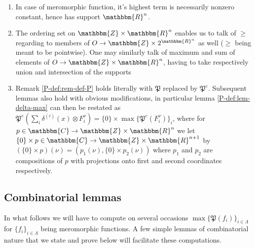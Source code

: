 \documentclass{article}
\numberwithin{definition}{section}
\numberwithin{lemma}{section}
\numberwithin{proposition}{section}
{\theorembodyfont{\rmfamily}\newtheorem{remark}{Remark}
\numberwithin{remark}{section}
}
\begin{document}
\begin{remark}
  
  \begin{enumerate}
    \item In case of meromorphic function, it's highest term is necessarily
    nonzero constant, hence has support $\mathbbm{R}^n$.
    
    \item The ordering set on $\mathbbm{Z} \times \mathbbm{R}^n$ enables us to
    talk of $\geqslant$ regarding to members of $O \rightarrow \mathbbm{Z}
    \times 2^{\mathbbm{R}^n}$ as well ($\geqslant$ being meant to be
    pointwise). One may similarly talk of maximum and sum of elements of $O
    \rightarrow \mathbbm{Z} \times \mathbbm{R}^n$, having to take respectively
    union and intersection of the supports
    
    \item Remark \ref{P-def:rem-def-P} holds literally with $\mathfrak{P}$
    replaced by $\mathfrak{P}^e$. Subsequent lemmas also hold with obvious
    modifications, in particular lemma \ref{P-def:lem-delta-max} can then be
    restated as $\mathfrak{P}^e \left( \sum_i \delta^{( i)} ( x) \otimes
    F_i^{\nu} \right) = \{ 0 \} \times \max \{ \mathfrak{P}^e ( F_i^{\nu})
    \}_i$, where for $p \in \mathbbm{C} \rightarrow \mathbbm{Z} \times
    \mathbbm{R}^n$ we let $\{ 0 \} \times p \in \mathbbm{C} \rightarrow
    \mathbbm{Z} \times \mathbbm{R}^{n + 1}$ by $( \{ 0 \} \times p) ( \nu) = (
    p_1 ( \nu), \{ 0 \} \times p_2 ( \nu))$ where $p_1$ and $p_2$ are
    compositions of $p$ with projections onto first and second coordinates
    respectively.
  \end{enumerate}
\end{remark}

\subsection{Combinatorial lemmas}

In what follows we will have to compute on several occasions $\max \{
\mathfrak{P} ( f_i) \}_{i \in \Lambda}$ for $\{ f_i \}_{i \in \Lambda}$ being
meromorphic functions. A few simple lemmas of combinatorial nature that we
state and prove below will facilitate these computations.
\end{document}
